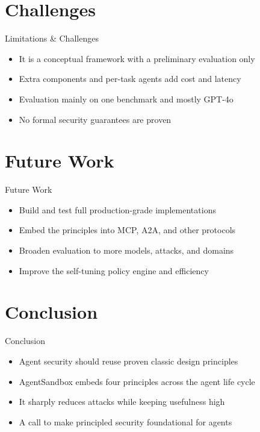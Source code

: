\documentclass[10pt]{beamer}
\begin{document}
\section{Challenges}
\begin{frame}{Limitations \& Challenges}
\begin{itemize}
  \item It is a conceptual framework with a preliminary evaluation only
  \item Extra components and per-task agents add cost and latency
  \item Evaluation mainly on one benchmark and mostly GPT-4o
  \item No formal security guarantees are proven
\end{itemize}
\end{frame}

\section{Future Work}
\begin{frame}{Future Work}
\begin{itemize}
  \item Build and test full production-grade implementations
  \item Embed the principles into MCP, A2A, and other protocols
  \item Broaden evaluation to more models, attacks, and domains
  \item Improve the self-tuning policy engine and efficiency
\end{itemize}
\end{frame}

\section{Conclusion}
\begin{frame}{Conclusion}
\begin{itemize}
  \item Agent security should reuse proven classic design principles
  \item AgentSandbox embeds four principles across the agent life cycle
  \item It sharply reduces attacks while keeping usefulness high
  \item A call to make principled security foundational for agents
\end{itemize}
\end{frame}
\end{document}
